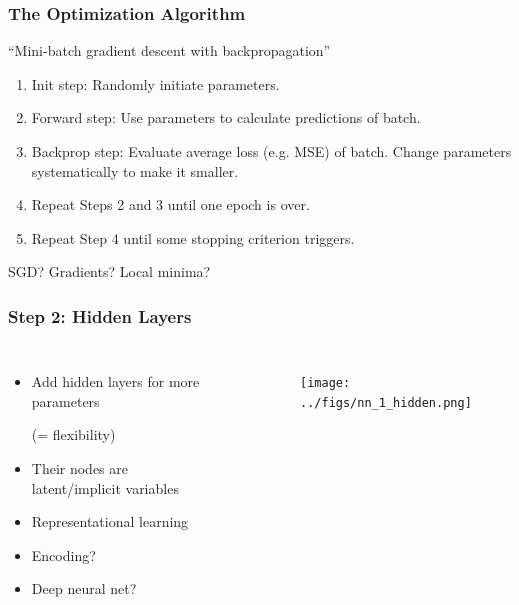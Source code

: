 \documentclass[
    utf8,
    aspectratio=169
]{beamer}  %
\begin{document}
\begin{frame}
	\frametitle{The Optimization Algorithm}
	\begin{block}{``Mini-batch gradient descent with \alert{backpropagation}''}
		\begin{enumerate}
			\item Init step: Randomly initiate parameters.
			\item Forward step: Use parameters to calculate predictions of \alert{batch}.
			\item Backprop step: Evaluate \alert{average loss} (e.g. MSE) of batch. Change parameters systematically to make it smaller.
			\item Repeat Steps 2 and 3 until one \alert{epoch} is over.
			\item Repeat Step 4 until some stopping criterion triggers.
		\end{enumerate}
	\end{block}

	\vfill

	SGD? Gradients? Local minima?
\end{frame}

\begin{frame}
	\frametitle{Step 2: Hidden Layers}
	\begin{columns}
		\begin{itemize}
			\item Add \alert{hidden layers} for more parameters 
			
			(= flexibility)
			\item Their nodes are latent/implicit variables
			\item Representational learning
			\item \small{\alert{Encoding}?}
			\item \small{\alert{Deep} neural net?}
		\end{itemize}
		\begin{example}
		\end{example}
		\begin{figure}
			\texttt{[image: ../figs/nn\_1\_hidden.png]}
		\end{figure}
	\end{columns}
\end{frame}
\end{document}
